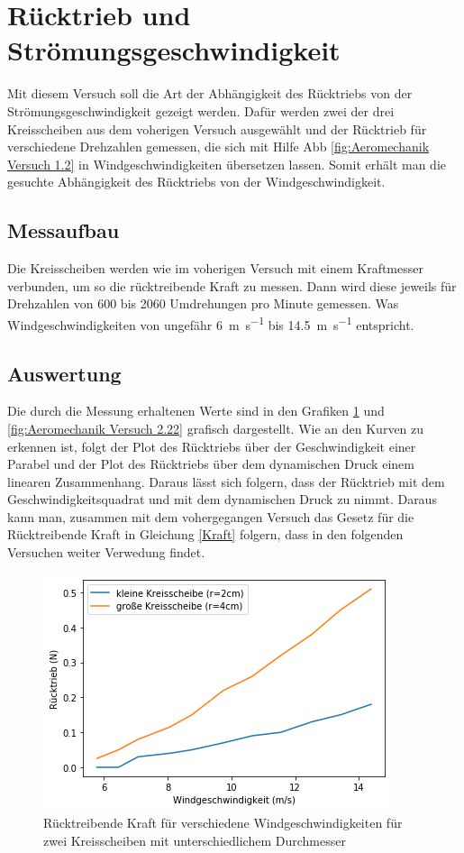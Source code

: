 \section{Rücktrieb und Strömungsgeschwindigkeit}

Mit diesem Versuch soll die Art der Abhängigkeit des Rücktriebs von der Strömungsgeschwindigkeit gezeigt werden. Dafür werden zwei der drei Kreisscheiben aus dem voherigen Versuch ausgewählt und der Rücktrieb für verschiedene Drehzahlen gemessen, die sich mit Hilfe Abb \ref{fig:Aeromechanik Versuch 1.2} in Windgeschwindigkeiten übersetzen lassen. Somit erhält man die gesuchte Abhängigkeit des Rücktriebs von der Windgeschwindigkeit.

\subsection{Messaufbau}

Die Kreisscheiben werden wie im voherigen Versuch mit einem Kraftmesser verbunden, um so die rücktreibende Kraft zu messen. Dann wird diese jeweils für Drehzahlen von 600 bis 2060 Umdrehungen pro Minute gemessen. Was Windgeschwindigkeiten von ungefähr \SI{6}{\metre\per\second} bis \SI{14.5}{\metre\per\second} entspricht.

\subsection{Auswertung}

Die durch die Messung erhaltenen Werte sind in den Grafiken  \ref{fig:Aeoreomechanik Versuch 2.21} und \ref{fig:Aeromechanik Versuch 2.22} grafisch dargestellt. Wie an den Kurven zu erkennen ist, folgt der Plot des Rücktriebs über der Geschwindigkeit einer Parabel und der Plot des Rücktriebs über dem dynamischen Druck einem linearen Zusammenhang. Daraus lässt sich folgern, dass der Rücktrieb mit dem Geschwindigkeitsquadrat und mit dem dynamischen Druck zu nimmt. Daraus kann man, zusammen mit dem vohergegangen Versuch das Gesetz für die Rücktreibende Kraft in Gleichung \ref{Kraft} folgern, dass in den folgenden Versuchen weiter Verwedung findet.

\begin{figure}[h]
    \centering
    \includegraphics[scale=0.8]{Aeromechanik/Protokoll/fig/Aeromechanik Versuch 2.21.png}
    \caption{Rücktreibende Kraft für verschiedene Windgeschwindigkeiten für zwei Kreisscheiben mit unterschiedlichem Durchmesser}
    \label{fig:Aeoreomechanik Versuch 2.21}
\end{figure}

